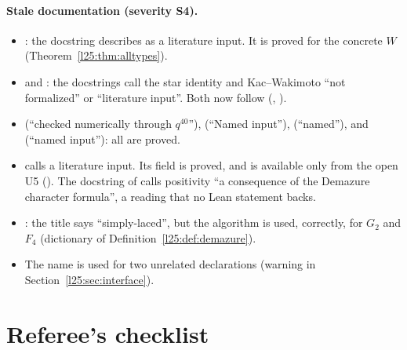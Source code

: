 \paragraph{Stale documentation (severity S4).}
\begin{itemize}
\item {}: the docstring describes  as a literature input.
  It is proved for the concrete $W$ (Theorem~\ref{l25:thm:alltypes}).
\item {} and : the docstrings call the star identity and
  Kac--Wakimoto ``not formalized'' or ``literature input''. Both now follow (,
  ).
\item {} (``checked numerically through $q^{40}$''),  (``Named input''),
   (``named''),  and  (``named input''): all are proved.
\item {} calls  a literature input. Its  field is
  proved, and  is available only from the open U5 (). The docstring of
   calls positivity ``a consequence of the Demazure character formula'', a reading
  that no Lean statement backs.
\item {}: the title says ``simply-laced'', but the algorithm is used, correctly, for
  $G_2$ and $F_4$ (dictionary of Definition~\ref{l25:def:demazure}).
\item The name  is used for two unrelated declarations (warning in Section~\ref{l25:sec:interface}).
\end{itemize}

\section{Referee's checklist}\label{l25:sec:checklist}

